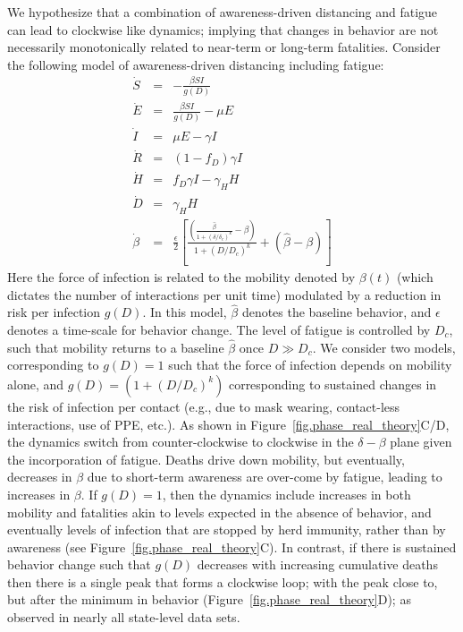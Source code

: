 We hypothesize that
a combination of awareness-driven distancing and fatigue
can lead to clockwise like dynamics; implying
that changes in behavior are not necessarily 
monotonically related to near-term or long-term fatalities.
Consider the following model of awareness-driven
distancing including fatigue:
\begin{eqnarray}
\dot{S} &=& -\frac{\beta SI}{g(D)}\\
\dot{E} &=& \frac{\beta SI}{g(D)}-\mu E\\
\dot{I} &=& \mu E-\gamma I \\
\dot{R} &=& (1-f_D)\gamma I\\
\dot{H} &=& f_D\gamma I - \gamma_H H\\
\dot{D} &=& \gamma_H H \\
\dot{\beta} &=&\frac{\epsilon}{2}\left[\frac{\left(\frac{\hat{\beta}}{1+\left(\delta/\delta_c\right)^{k}}-\beta\right)}{1+\left(D/D_c\right)^k}+\left(\hat{\beta}-\beta\right)\right] \label{eq.fatigue}
\end{eqnarray}
Here the force of infection is related to the
mobility denoted by $\beta(t)$ (which dictates
the number of interactions per unit time) modulated by
a reduction in risk per infection $g(D)$.
In this model,
$\hat{\beta}$ denotes the baseline behavior,
and $\epsilon$ denotes a time-scale for behavior change.  
The level of fatigue is controlled by $D_c$, such that
mobility returns to a baseline $\hat{\beta}$ once $D\gg D_c$.
We consider two models, corresponding to
$g(D)=1$ such that the force of infection depends on mobility alone,
and 
$g(D)=\left(1+(D/D_c)^k\right)$
corresponding to sustained changes in the risk of infection
per contact (e.g., due to mask wearing, contact-less
interactions, use of PPE, etc.). 
As shown in Figure~\ref{fig.phase_real_theory}C/D, the dynamics 
switch from counter-clockwise to clockwise in the $\delta-\beta$ plane
given the incorporation of fatigue.
Deaths drive down mobility, but eventually,
decreases in $\beta$ due to short-term awareness
are over-come by fatigue, leading to increases in $\beta$.
If $g(D)=1$, then 
the dynamics include increases in both mobility and fatalities
akin to levels expected in the absence of behavior, and eventually
levels of infection that are stopped by herd immunity, rather than by 
awareness (see Figure~\ref{fig.phase_real_theory}C).  
In contrast, if there is sustained behavior change
such that $g(D)$ decreases with increasing cumulative deaths
then there is a single peak that forms a clockwise loop; with
the peak close to, but after the minimum in behavior (Figure~\ref{fig.phase_real_theory}D); as observed in nearly all state-level data sets.

